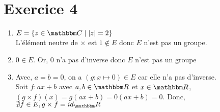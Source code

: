 \part{Exercice 4}

\begin{enumerate}
	\item $E = \left\{ z \in \C \mid \left| z \right| =2 \right\}$\\
		L'élément neutre de $\times$ est $1 \not\in E$ donc $E$ n'est pas un groupe.
	\item $0 \in E$. Or, $0$ n'a pas d'inverse donc $E$ n'est pas un groupe
	\item Avec, $a = b = 0$, on a $(g: x \mapsto 0) \in E$ car elle n'a pas d'inverse.\\
		Soit $f: ax+b$ avec $a, b \in \R$ et $x \in \R$, $(g\times f) (x) = g(ax+b)= 0(ax+b) = 0$.
		Donc, $\nexists f \in E, g \times f = id_\R$
\end{enumerate}
